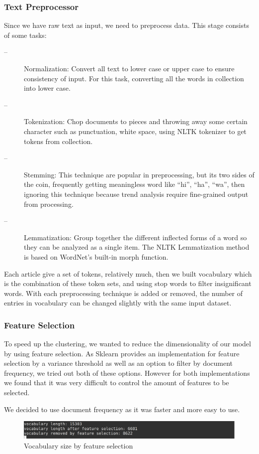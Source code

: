 \subsubsection{Text Preprocessor}
Since we have raw text as input, we need to preprocess data. This stage consists of some tasks:
\begin{description}
\item[--]Normalization: Convert all text to lower case or upper case to ensure consistency of input. For this task, converting all the words in collection into lower case.
\item[--]Tokenization: Chop documents to pieces and throwing away some certain character such as punctuation, white space, using NLTK tokenizer to get tokens from collection.
\item[-- ]Stemming: This technique are popular in preprocessing, but its two sides of the coin, frequently getting meaningless word like “hi”, “ha”, “wa”, then ignoring this technique because trend analysis require fine-grained output from processing.
\item[--] Lemmatization: Group together the different inflected forms of a word so they can be analyzed as a single item. The NLTK Lemmatization method is based on WordNet’s built-in morph function.
\end{description}
Each article give a set of tokens, relatively much, then we built vocabulary which is the combination of these token sets, and using stop words to filter insignificant words. With each preprocessing technique is added or removed, the number of entries in vocabulary can be changed slightly with the same input dataset.
\subsubsection{Feature Selection}
To speed up the clustering, we wanted to reduce the dimensionality of our model by using feature selection. As Sklearn provides an implementation for feature selection by a variance threshold as well as an option to filter by document frequency, we tried out both of these options.
However for both implementations we found that it was very difficult to control the amount of features to be selected.

We decided to use document frequency as it was faster and more easy to use.

\begin{figure}[h]
\centering
\includegraphics[scale= 0.15]{feature_selection.png}
\caption{Vocabulary size by feature selection}
\end{figure}

